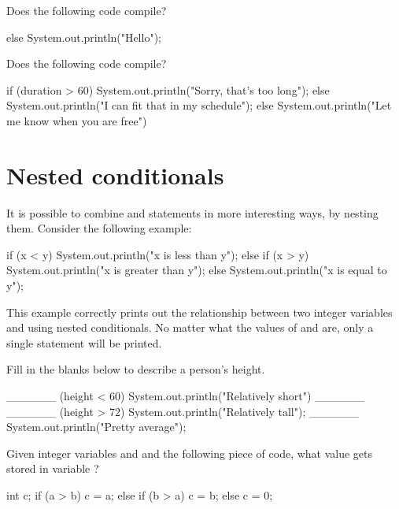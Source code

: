 \begin{example}
Does the following code compile?

\begin{code}
else {
    System.out.println("Hello");
}
\end{code}
\end{example}

\begin{example}
Does the following code compile?

\begin{code}
if (duration > 60) {
    System.out.println("Sorry, that's too long");
}
else {
    System.out.println("I can fit that in my schedule");
} else {
    System.out.println("Let me know when you are free")
}
\end{code}
\end{example}

\section{Nested conditionals}
It is possible to combine  and  statements in more interesting ways, by nesting them. Consider the following example:

\begin{code}
if (x < y) {
    System.out.println("x is less than y");
} else {
    if (x > y) {
        System.out.println("x is greater than y");
    } else {
        System.out.println("x is equal to y");
    }
}
\end{code}

This example correctly prints out the relationship between two integer variables  and  using nested conditionals. No matter what the values of  and  are, only a single statement will be printed. 

\begin{example}
Fill in the blanks below to describe a person's height.

\begin{code}
______ (height < 60) {
    System.out.println("Relatively short")
} ______ {
    ______ (height > 72) {
        System.out.println("Relatively tall");
    } ______ {
        System.out.println("Pretty average");
    }
}
\end{code}
\end{example}

\begin{example}
Given integer variables  and  and the following piece of code, what value gets stored in variable ?

\begin{code}
int c;
if (a > b) {
    c = a;
} else {
    if (b > a) {
        c = b;
    } else {
        c = 0;
    }
}
\end{code}
\end{example}

